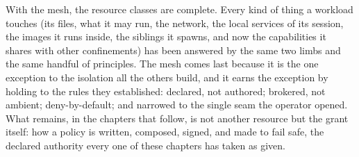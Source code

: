 With the mesh, the resource classes are complete. Every kind of thing a
workload touches (its files, what it may run, the network, the local
services of its session, the images it runs inside, the siblings it
spawns, and now the capabilities it shares with other confinements) has
been answered by the same two limbs and the same handful of principles.
The mesh comes last because it is the one exception to the isolation all
the others build, and it earns the exception by holding to the rules
they established: declared, not authored; brokered, not ambient;
deny-by-default; and narrowed to the single seam the operator opened.
What remains, in the chapters that follow, is not another resource but
the grant itself: how a policy is written, composed, signed, and made to
fail safe, the declared authority every one of these chapters has taken
as given.
